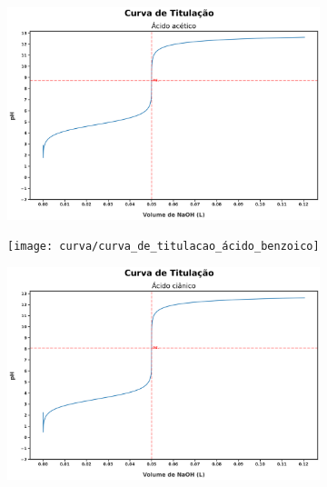 \documentclass[a4paper, 12pt]{article}
\begin{document}
\begin{figure}[H]
	\begin{subfigure}{0.5\textwidth}
		\centering
		\includegraphics[width=0.9\linewidth]{curva/curva_de_titulacao_ácido_acético}
		\caption{}
		\label{fig:curvadetitulacaoacidoacetico}
	\end{subfigure}
	\begin{subfigure}{0.5\textwidth}
		\centering
		\texttt{[image: curva/curva\_de\_titulacao\_ácido\_benzoico]}
		\caption{}
		\label{fig:curvadetitulacaoácidobenzoico}
	\end{subfigure}
	\begin{subfigure}{0.5\textwidth}
		\centering
		\includegraphics[width=0.9\linewidth]{curva/curva_de_titulacao_ácido_ciânico}
		\caption{}
		\label{fig:curvadetitulacaoácidociânico}
	\end{subfigure}
	\begin{subfigure}{0.5\textwidth}
		\centering

\end{subfigure}
\end{figure}
\end{document}
